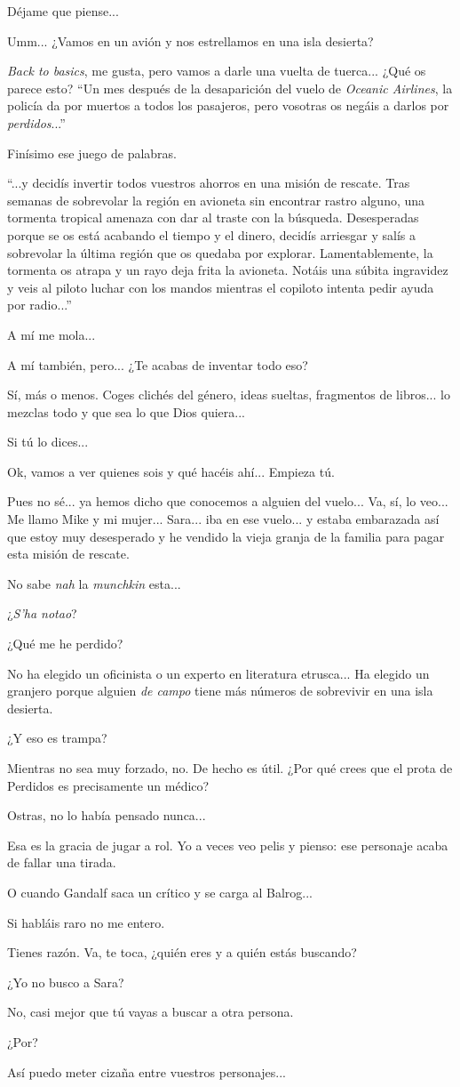 \documentclass[10pt, a5paper, twocolumn]{article}
\newenvironment{dialogue}
    {\begin{description}[leftmargin=!,align=right,labelwidth=0.cm]}
    {\end{description}}
\newcommand\A{\item[\raisebox{-0.25em}{\scalebox{0.75}{\bctetraedre}}]}
\newcommand\B{\item[\raisebox{-0.25em}{\scalebox{0.75}{\bccube}}]}
\newcommand\E{\item[\raisebox{-0.25em}{\scalebox{0.75}{\bcicosaedre}}]}
\begin{document}
\begin{dialogue}
        \B Déjame que piense...
        \A Umm... ¿Vamos en un avión y nos estrellamos en una isla desierta?
        \E \emph{Back to basics}, me gusta, pero vamos a darle una vuelta de tuerca... ¿Qué os parece esto? ``Un mes después de la desaparición del vuelo de \emph{Oceanic Airlines}, la policía da por muertos a todos los pasajeros, pero vosotras os negáis a darlos por \emph{perdidos}...''
        \B Finísimo ese juego de palabras.
        \E ``...y decidís invertir todos vuestros ahorros en una misión de rescate. Tras semanas de sobrevolar la región en avioneta sin encontrar rastro alguno, una tormenta tropical amenaza con dar al traste con la búsqueda. Desesperadas porque se os está acabando el tiempo y el dinero, decidís arriesgar y salís a sobrevolar la última región que os quedaba por explorar. Lamentablemente, la tormenta os atrapa y un rayo deja frita la avioneta. Notáis una súbita ingravidez y veis al piloto luchar con los mandos mientras el copiloto intenta pedir ayuda por radio...''
        \B A mí me mola...
        \A A mí también, pero... ¿Te acabas de inventar todo eso?
        \E Sí, más o menos. Coges clichés del género, ideas sueltas, fragmentos de libros... lo mezclas todo y que sea lo que Dios quiera...
        \A Si tú lo dices...
        \E Ok, vamos a ver quienes sois y qué hacéis ahí... Empieza tú.
        \B Pues no sé... ya hemos dicho que conocemos a alguien del vuelo... Va, sí, lo veo... Me llamo Mike y mi mujer... Sara... iba en ese vuelo... y estaba embarazada así que estoy muy desesperado y he vendido la vieja granja de la familia para pagar esta misión de rescate.
        \E No sabe \emph{nah} la \emph{munchkin} esta...
        \B ¿\emph{S'ha notao}?
        \A ¿Qué me he perdido?
        \E No ha elegido un oficinista o un experto en literatura etrusca... Ha elegido un granjero porque alguien \emph{de campo} tiene más números de sobrevivir en una isla desierta.
        \A ¿Y eso es trampa?
        \E Mientras no sea muy forzado, no. De hecho es útil. ¿Por qué crees que el prota de Perdidos es precisamente un médico?
        \A Ostras, no lo había pensado nunca...
        \B Esa es la gracia de jugar a rol. Yo a veces veo pelis y pienso: ese personaje acaba de fallar una tirada.
        \E O cuando Gandalf saca un crítico y se carga al Balrog...
        \A Si habláis raro no me entero.
        \E Tienes razón. Va, te toca, ¿quién eres y a quién estás buscando?
        \A ¿Yo no busco a Sara?
        \E No, casi mejor que tú vayas a buscar a otra persona.
        \A ¿Por?
        \E Así puedo meter cizaña entre vuestros personajes...

\end{dialogue}
\end{document}

